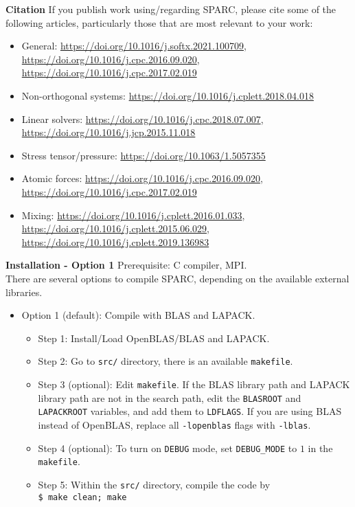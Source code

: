\begin{frame}[allowframebreaks]{\textbf{Citation}} \label{Citation}
If you publish work using/regarding SPARC, please cite some of the following articles, particularly those that are most relevant to your work:
\begin{itemize}
    \item General: \url{https://doi.org/10.1016/j.softx.2021.100709}, \url{https://doi.org/10.1016/j.cpc.2016.09.020}, \url{https://doi.org/10.1016/j.cpc.2017.02.019}
    \item Non-orthogonal systems: \url{https://doi.org/10.1016/j.cplett.2018.04.018}
    \item Linear solvers: \url{https://doi.org/10.1016/j.cpc.2018.07.007},    \url{https://doi.org/10.1016/j.jcp.2015.11.018}
    \item Stress tensor/pressure: \url{https://doi.org/10.1063/1.5057355}
    \item Atomic forces: \url{https://doi.org/10.1016/j.cpc.2016.09.020}, \url{https://doi.org/10.1016/j.cpc.2017.02.019}
    \item Mixing: \url{https://doi.org/10.1016/j.cplett.2016.01.033}, \url{https://doi.org/10.1016/j.cplett.2015.06.029}, \url{https://doi.org/10.1016/j.cplett.2019.136983}
\end{itemize}
\end{frame}


\begin{frame}{\textbf{Installation - Option 1}} \label{Installation:1}
Prerequisite: C compiler, MPI.\\
There are several options to compile SPARC, depending on the available external libraries.
\begin{itemize}
\item Option 1 (default): Compile with BLAS and LAPACK.
	\begin{itemize}
		\item Step 1: Install/Load OpenBLAS/BLAS and LAPACK.
		\item Step 2: Go to \texttt{src/} directory, there is an available \texttt{makefile}.
		\item Step 3 (optional): Edit \texttt{makefile}. If the BLAS library path and LAPACK library path are not in the search path, edit the \texttt{BLASROOT} and \texttt{LAPACKROOT} variables, and add them to \texttt{LDFLAGS}. If you are using BLAS instead of OpenBLAS, replace all \texttt{-lopenblas} flags with \texttt{-lblas}.
		\item Step 4 (optional): To turn on \texttt{DEBUG} mode, set \texttt{DEBUG\_MODE} to $1$ in the \texttt{makefile}.
		\item Step 5: Within the \texttt{src/} directory, compile the code by \\
		      \texttt{\$ make clean; make}
	\end{itemize}
\end{itemize}
\end{frame}

